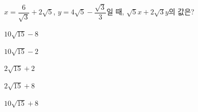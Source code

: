 $x=\dfrac{6}{\sqrt{3}}+2\sqrt{5}$, $y=4\sqrt{5}-\dfrac{\sqrt{3}}{3}$일 때, $\sqrt{5}x+2\sqrt{3}y$의 값은?
\begin{choices32}{\rule[-3ex]{0pt}{8ex}$10\sqrt{15}-8$}{\rule[-3ex]{0pt}{8ex}$10\sqrt{15}-2$}{\rule[-3ex]{0pt}{8ex}$2\sqrt{15}+2$}{\rule[-3ex]{0pt}{8ex}$2\sqrt{15}+8$}{\rule[-3ex]{0pt}{8ex}$10\sqrt{15}+8$}\end{choices32}
